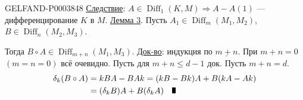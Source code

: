 \begin{GelfandAdjacentEvidence}{GELFAND-P000384}{8}
\underline{Следствие}: $A\in\operatorname{Diff}_1(K,M)\Longrightarrow A-A(1)$ --- дифференцирование $K$ в $M$.
\underline{Лемма 3}. Пусть $A_1\in\operatorname{Diff}_m(M_1,M_2)$, $B\in\operatorname{Diff}_n(M_2,M_3)$.
\end{GelfandAdjacentEvidence}

Тогда $B\circ A\in\operatorname{Diff}_{m+n}(M_1,M_3)$.
\underline{Док-во}: индукция по $\underline{m+n}$.
При $m+n=0$ $(m=n=0)$ всё очевидно.
Пусть для $m+n\le d-1$ док. Пусть $m+n=d$.
\begin{align*}\delta_k(B\circ A)&=kBA-BAk=(kB-Bk)A+B(kA-Ak)\\&=(\delta_kB)A+B(\delta_kA)\quad\text{\rule{1.5mm}{2.5mm}}\end{align*}





